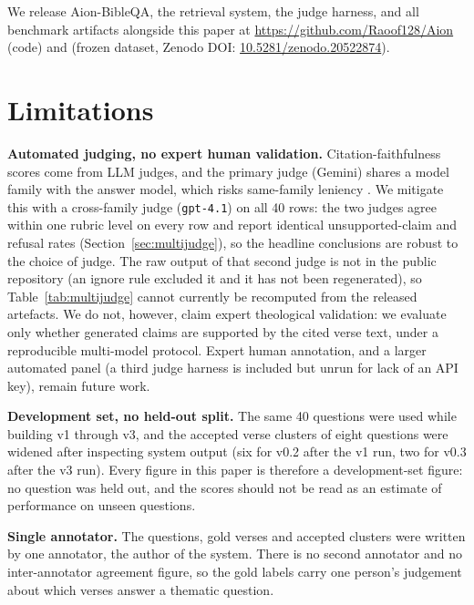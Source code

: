 \documentclass[11pt]{article}
\begin{document}
We release Aion-BibleQA, the retrieval system, the judge harness, and all benchmark artifacts alongside this paper at \url{https://github.com/Raoof128/Aion} (code) and \citep{aion2026benchmark} (frozen dataset, Zenodo DOI: \href{https://doi.org/10.5281/zenodo.20522874}{10.5281/zenodo.20522874}).

\section*{Limitations}

\textbf{Automated judging, no expert human validation.} Citation-faithfulness scores come from LLM judges, and the primary judge (Gemini) shares a model family with the answer model, which risks same-family leniency \citep{zheng2023judging}. We mitigate this with a cross-family judge (\texttt{gpt-4.1}) on all 40 rows: the two judges agree within one rubric level on every row and report identical unsupported-claim and refusal rates (Section~\ref{sec:multijudge}), so the headline conclusions are robust to the choice of judge. The raw output of that second judge is not in the public repository (an ignore rule excluded it and it has not been regenerated), so Table~\ref{tab:multijudge} cannot currently be recomputed from the released artefacts. We do not, however, claim expert theological validation: we evaluate only whether generated claims are supported by the cited verse text, under a reproducible multi-model protocol. Expert human annotation, and a larger automated panel (a third judge harness is included but unrun for lack of an API key), remain future work.

\textbf{Development set, no held-out split.} The same 40 questions were used while building v1 through v3, and the accepted verse clusters of eight questions were widened after inspecting system output (six for v0.2 after the v1 run, two for v0.3 after the v3 run). Every figure in this paper is therefore a development-set figure: no question was held out, and the scores should not be read as an estimate of performance on unseen questions.

\textbf{Single annotator.} The questions, gold verses and accepted clusters were written by one annotator, the author of the system. There is no second annotator and no inter-annotator agreement figure, so the gold labels carry one person's judgement about which verses answer a thematic question.
\end{document}
